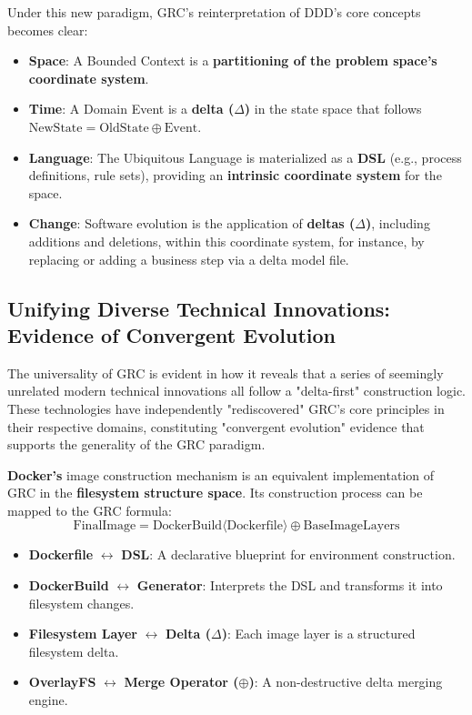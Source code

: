 \documentclass[11pt]{article}
\begin{document}
Under this new paradigm, GRC's reinterpretation of DDD's core concepts becomes clear:
\begin{itemize}
    \item \textbf{Space}: A Bounded Context is a \textbf{partitioning of the problem space's coordinate system}.
    \item \textbf{Time}: A Domain Event is a \textbf{delta ($\Delta$)} in the state space that follows $\text{NewState} = \text{OldState} \oplus \text{Event}$.
    \item \textbf{Language}: The Ubiquitous Language is materialized as a \textbf{DSL} \cite{fowler2010dsl} (e.g., process definitions, rule sets), providing an \textbf{intrinsic coordinate system} for the space.
    \item \textbf{Change}: Software evolution is the application of \textbf{deltas ($\Delta$)}, including additions and deletions, within this coordinate system, for instance, by replacing or adding a business step via a delta model file.
\end{itemize}

\subsection{Unifying Diverse Technical Innovations: Evidence of Convergent Evolution}

The universality of GRC is evident in how it reveals that a series of seemingly unrelated modern technical innovations all follow a "delta-first" construction logic. These technologies have independently "rediscovered" GRC's core principles in their respective domains, constituting "convergent evolution" evidence that supports the generality of the GRC paradigm.

\textbf{Docker's} image construction mechanism is an equivalent implementation of GRC in the \textbf{filesystem structure space}. Its construction process can be mapped to the GRC formula:
\[
\text{FinalImage} = \text{DockerBuild}\langle\text{Dockerfile}\rangle \oplus \text{BaseImageLayers}
\]
\begin{itemize}
    \item \textbf{Dockerfile} $\leftrightarrow$ \textbf{DSL}: A declarative blueprint for environment construction.
    \item \textbf{DockerBuild} $\leftrightarrow$ \textbf{Generator}: Interprets the DSL and transforms it into filesystem changes.
    \item \textbf{Filesystem Layer} $\leftrightarrow$ \textbf{Delta ($\Delta$)}: Each image layer is a structured filesystem delta.
    \item \textbf{OverlayFS} $\leftrightarrow$ \textbf{Merge Operator ($\oplus$)}: A non-destructive delta merging engine.
\end{itemize}
\end{document}
